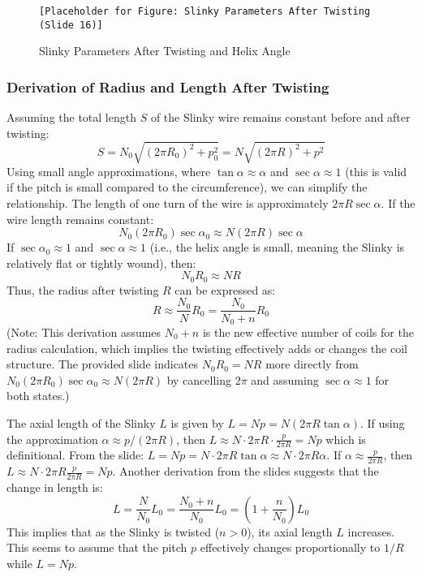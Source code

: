 \documentclass{mcmthesis}  %
\begin{document}
\begin{figure}[h!]
    \centering
    \texttt{[Placeholder for Figure: Slinky Parameters After Twisting (Slide 16)]}
    \caption{Slinky Parameters After Twisting and Helix Angle}
    \label{fig:twisted_params}
\end{figure}

\subsubsection{Derivation of Radius and Length After Twisting}
Assuming the total length \(S\) of the Slinky wire remains constant before and after twisting:
\[ S = N_0 \sqrt{(2\pi R_0)^2 + p_0^2} = N \sqrt{(2\pi R)^2 + p^2} \]
Using small angle approximations, where \(\tan \alpha \approx \alpha\) and \(\sec \alpha \approx 1\) (this is valid if the pitch is small compared to the circumference), we can simplify the relationship. The length of one turn of the wire is approximately \(2\pi R \sec \alpha\). If the wire length remains constant:
\[ N_0 (2\pi R_0) \sec \alpha_0 \approx N (2\pi R) \sec \alpha \]
If \(\sec \alpha_0 \approx 1\) and \(\sec \alpha \approx 1\) (i.e., the helix angle is small, meaning the Slinky is relatively flat or tightly wound), then:
\[ N_0 R_0 \approx N R \]
Thus, the radius after twisting \(R\) can be expressed as:
\[ R \approx \frac{N_0}{N} R_0 = \frac{N_0}{N_0 + n} R_0 \]
(Note: This derivation assumes \(N_0 + n\) is the new effective number of coils for the radius calculation, which implies the twisting effectively adds or changes the coil structure. The provided slide indicates \(N_0 R_0 = NR\) more directly from \(N_0(2 \pi R_0) \sec \alpha_0 \approx N(2 \pi R)\) by cancelling \(2\pi\) and assuming \(\sec \alpha \approx 1\) for both states.)

The axial length of the Slinky \(L\) is given by \(L = Np = N (2\pi R \tan \alpha)\). 
If using the approximation \(\alpha \approx p / (2\pi R)\), then \(L \approx N \cdot 2 \pi R \cdot \frac{p}{2\pi R} = Np\) which is definitional.
From the slide: \(L = Np = N \cdot 2\pi R \tan \alpha \approx N \cdot 2\pi R \alpha\).
If \(\alpha \approx \frac{p}{2\pi R}\), then \(L \approx N \cdot 2\pi R \frac{p}{2\pi R} = Np\).
Another derivation from the slides suggests that the change in length is:
\[ L = \frac{N}{N_0} L_0 = \frac{N_0+n}{N_0} L_0 = \left(1 + \frac{n}{N_0}\right) L_0 \]
This implies that as the Slinky is twisted (\(n > 0\)), its axial length \(L\) increases. This seems to assume that the pitch \(p\) effectively changes proportionally to \(1/R\) while \(L=Np\).
\end{document}
